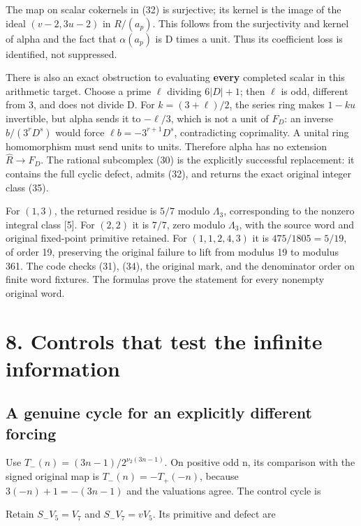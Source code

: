 The map on scalar cokernels in (32) is surjective; its kernel is the
image of the ideal \((v-2,3u-2)\) in \(R/(a_p)\). This follows from the
surjectivity and kernel of alpha and the fact that \(\alpha(a_p)\) is D
times a unit. Thus its coefficient loss is identified, not suppressed.

There is also an exact obstruction to evaluating \textbf{every}
completed scalar in this arithmetic target. Choose a prime \(\ell\)
dividing \(6|D|+1\); then \(\ell\) is odd, different from 3, and does
not divide D. For \(k=(3+\ell)/2\), the series ring makes \(1-ku\)
invertible, but alpha sends it to \(-\ell/3\), which is not a unit of
\(F_D\): an inverse \(b/(3^rD^s)\) would force \(\ell b=-3^{r+1}D^s\),
contradicting coprimality. A unital ring homomorphism must send units to
units. Therefore alpha has no extension \(\widehat R\to F_D\). The
rational subcomplex (30) is the explicitly successful replacement: it
contains the full cyclic defect, admits (32), and returns the exact
original integer class (35).

For \((1,3)\), the returned residue is \(5/7\) modulo \(\Lambda_3\),
corresponding to the nonzero integral class {[}5{]}. For \((2,2)\) it is
\(7/7\), zero modulo \(\Lambda_3\), with the source word and original
fixed-point primitive retained. For \((1,1,2,4,3)\) it is
\(475/1805=5/19\), of order 19, preserving the original failure to lift
from modulus 19 to modulus 361. The code checks (31), (34), the original
mark, and the denominator order on finite word fixtures. The formulas
prove the statement for every nonempty original word.

\section{8. Controls that test the infinite information}

\subsection{A genuine cycle for an explicitly different forcing}

Use \(T_-(n)=(3n-1)/2^{\nu_2(3n-1)}\). On positive odd n, its comparison
with the signed original map is \(T_-(n)=-T_+(-n)\), because
\(3(-n)+1=-(3n-1)\) and the valuations agree. The control cycle is


Retain \(S_-V_5=V_7\) and \(S_-V_7=vV_5\). Its primitive and defect are

